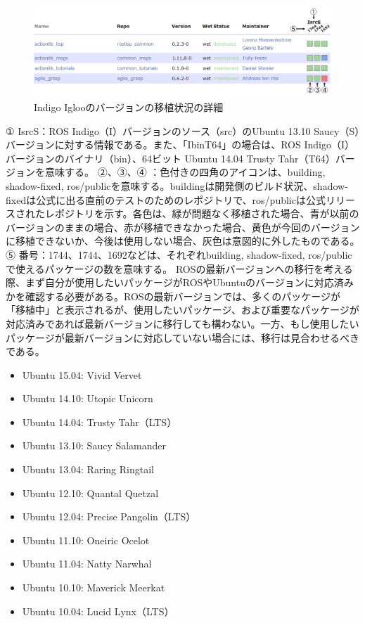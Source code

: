 \begin{figure}[h]
  \centering
  \includegraphics[width=\columnwidth]{pictures/chapter1/pic_01_10.png}
  \caption{Indigo Iglooのバージョンの移植状況の詳細}
\end{figure}

① IsrcS：ROS Indigo（I）バージョンのソース（src）のUbuntu 13.10 Saucy（S）バージョンに対する情報である。また、「IbinT64」の場合は、ROS Indigo（I）バージョンのバイナリ（bin）、64ビット Ubuntu 14.04 Trusty Tahr（T64）バージョンを意味する。
②、③、④ ：色付きの四角のアイコンは、building, shadow-fixed, ros/publicを意味する。buildingは開発側のビルド状況、shadow-fixedは公式に出る直前のテストのためのレポジトリで、ros/publicは公式リリースされたレポジトリを示す。各色は、緑が問題なく移植された場合、青が以前のバージョンのままの場合、赤が移植できなかった場合、黄色が今回のバージョンに移植できないか、今後は使用しない場合、灰色は意図的に外したものである。
⑤ 番号：1744、1744、1692などは、それぞれbuilding, shadow-fixed, ros/publicで使えるパッケージの数を意味する。
ROSの最新バージョンへの移行を考える際、まず自分が使用したいパッケージがROSやUbuntuのバージョンに対応済みかを確認する必要がある。ROSの最新バージョンでは、多くのパッケージが「移植中」と表示されるが、使用したいパッケージ、および重要なパッケージが対応済みであれば最新バージョンに移行しても構わない。一方、もし使用したいパッケージが最新バージョンに対応していない場合には、移行は見合わせるべきである。

\begin{itemize}
\item Ubuntu 15.04: Vivid Vervet
\item Ubuntu 14.10: Utopic Unicorn
\item Ubuntu 14.04: Trusty Tahr（LTS）
\item Ubuntu 13.10: Saucy Salamander
\item Ubuntu 13.04: Raring Ringtail
\item Ubuntu 12.10: Quantal Quetzal
\item Ubuntu 12.04: Precise Pangolin（LTS）
\item Ubuntu 11.10: Oneiric Ocelot
\item Ubuntu 11.04: Natty Narwhal
\item Ubuntu 10.10: Maverick Meerkat
\item Ubuntu 10.04: Lucid Lynx（LTS）
\end{itemize}

